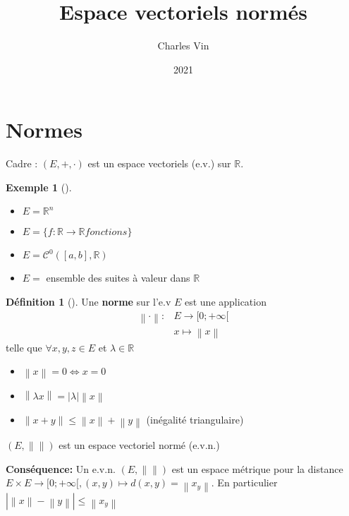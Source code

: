 \documentclass{article}
\title{Espace vectoriels normés}
\author{Charles Vin}
\date{2021}
\theoremstyle{plain}%
\theoremstyle{definition}
\newtheorem{defn}{Définition}[section]
\newtheorem{exmp}{Exemple}[section]
\theoremstyle{remark}
\begin{document}
\maketitle

\section{Normes}
Cadre : $(E, +, \cdot )$ est un espace vectoriels (e.v.) sur $ \mathbb{R} $.
\begin{exmp}[]
	\begin{itemize}
		\item $E = \mathbb{R}^n $
		\item $ E = \{f: \mathbb{R} \to \mathbb{R} fonctions\} $ 
		\item $ E = \mathcal{C}^0 ([a,b], \mathbb{R}) $ 
		\item $ E =  $ ensemble des suites à valeur dans $ \mathbb{R} $  
	\end{itemize}
\end{exmp}

\begin{defn}[]
	Une \textbf{norme} sur l'e.v $ E $ est une application
	\begin{align*}
		\left\| \cdot  \right\|  :& E \to [0;+ \infty [ \\
								& x \mapsto \left\| x \right\| 
	\end{align*}
	telle que $ \forall x,y,z \in E $ et $ \lambda \in \mathbb{R} $ 
	\begin{itemize}
		\item $ \left\| x \right\| = 0 \Leftrightarrow x=0 $ 
		\item $ \left\| \lambda x \right\| = \left| \lambda  \right| \left\| x \right\|  $ 
		\item $ \left\| x+y \right\| \leq \left\| x \right\| + \left\| y \right\|  $ (inégalité triangulaire)
	\end{itemize}
	$ (E, \left\|  \right\| ) $ est un espace vectoriel normé (e.v.n.)
\end{defn}
\textbf{Conséquence:} Un e.v.n. $ (E, \left\|  \right\| ) $ est un espace métrique pour la distance $ E \times E \to [0;+\infty [, (x,y) \mapsto d(x,y) = \left\| x_y \right\| $. En particulier $ \left| \left\| x \right\| - \left\| y \right\|  \right| \leq \left\| x_y \right\|  $ 
\end{document}
